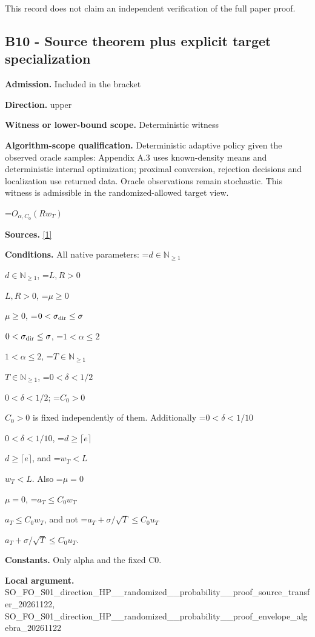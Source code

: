 \documentclass[10pt,a4paper]{article}
\newcommand{\AtlasMath}[1]{\par\begingroup\centering\setbox0=\hbox{$\displaystyle #1$}\ifdim\wd0>1.4\linewidth\typeout{ATLAS WIDE FORMULA: \the\wd0}\fi\ifdim\wd0>\linewidth\resizebox{\linewidth}{!}{\box0}\else\box0\fi\par\endgroup}
\newcommand{\AtlasInlineMath}[1]{\begingroup\setbox0=\hbox{$#1$}\ifdim\wd0>.4\linewidth\endgroup\AtlasMath{#1}\else\endgroup$#1$\fi}
\begin{document}
This record does not claim an independent verification of the full paper proof.



\subsection{B10 - Source theorem plus explicit target specialization}


\textbf{Admission.} Included in the bracket



\textbf{Direction.} upper



\textbf{Witness or lower-bound scope.} Deterministic witness



\textbf{Algorithm-scope qualification.} Deterministic adaptive policy given the observed oracle samples: Appendix A.3 uses known-density means and deterministic internal optimization; proximal conversion, rejection decisions and localization use returned data. Oracle observations remain stochastic. This witness is admissible in the randomized-allowed target view.



\AtlasMath{O_{\alpha,C_0}\!\left(Rw_T\right)}


\textbf{Sources.} \href{https://arxiv.org/html/2610.00260v2}{[1]}



\textbf{Conditions.} All native parameters: \AtlasInlineMath{d\in\mathbb N_{\ge1}}, \AtlasInlineMath{L,R>0}, \AtlasInlineMath{\mu\ge0}, \AtlasInlineMath{0<\sigma_{\rm dir}\le\sigma}, \AtlasInlineMath{1<\alpha\le2}, \AtlasInlineMath{T\in\mathbb N_{\ge1}}, \AtlasInlineMath{0<\delta<1/2}; \AtlasInlineMath{C_0>0} is fixed independently of them. Additionally \AtlasInlineMath{0<\delta<1/10}, \AtlasInlineMath{d\ge\lceil e\rceil}, and \AtlasInlineMath{w_T<L}. Also \AtlasInlineMath{\mu=0}, \AtlasInlineMath{a_T\le C_0w_T}, and not \AtlasInlineMath{a_T+\sigma/\sqrt T\le C_0u_T}.



\textbf{Constants.} Only alpha and the fixed C0.



\textbf{Local argument.} SO\_FO\_S01\_direction\_HP\_\_\allowbreak{}randomized\_\_probability\_\allowbreak{}\_proof\_source\_transfer\_2\allowbreak{}0261122, SO\_FO\_S01\_direction\_HP\_\_\allowbreak{}randomized\_\_probability\_\allowbreak{}\_proof\_envelope\_algebra\_\allowbreak{}20261122
\end{document}
